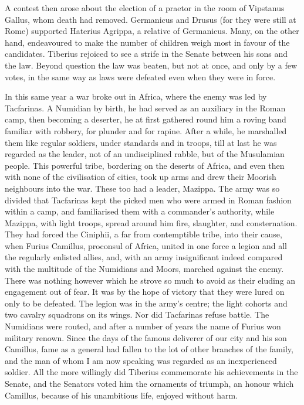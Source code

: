 
A contest then arose about the election of a praetor in the room of Vipstanus Gallus, whom death had removed. Germanicus and Drusus (for they were still at Rome) supported Haterius Agrippa, a relative of Germanicus. Many, on the other hand, endeavoured to make the number of children weigh most in favour of the candidates. Tiberius rejoiced to see a strife in the Senate between his sons and the law. Beyond question the law was beaten, but not at once, and only by a few votes, in the same way as laws were defeated even when they were in force.


In this same year a war broke out in Africa, where the enemy was led by Tacfarinas. A Numidian by birth, he had served as an auxiliary in the Roman camp, then becoming a deserter, he at first gathered round him a roving band familiar with robbery, for plunder and for rapine. After a while, he marshalled them like regular soldiers, under standards and in troops, till at last he was regarded as the leader, not of an undisciplined rabble, but of the Musulamian people. This powerful tribe, bordering on the deserts of Africa, and even then with none of the civilisation of cities, took up arms and drew their Moorish neighbours into the war. These too had a leader, Mazippa. The army was so divided that Tacfarinas kept the picked men who were armed in Roman fashion within a camp, and familiarised them with a commander's authority, while Mazippa, with light troops, spread around him fire, slaughter, and consternation. They had forced the Ciniphii, a far from contemptible tribe, into their cause, when Furius Camillus, proconsul of Africa, united in one force a legion and all the regularly enlisted allies, and, with an army insignificant indeed compared with the multitude of the Numidians and Moors, marched against the enemy. There was nothing however which he strove so much to avoid as their eluding an engagement out of fear. It was by the hope of victory that they were lured on only to be defeated. The legion was in the army's centre; the light cohorts and two cavalry squadrons on its wings. Nor did Tacfarinas refuse battle. The Numidians were routed, and after a number of years the name of Furius won military renown. Since the days of the famous deliverer of our city and his son Camillus, fame as a general had fallen to the lot of other branches of the family, and the man of whom I am now speaking was regarded as an inexperienced soldier. All the more willingly did Tiberius commemorate his achievements in the Senate, and the Senators voted him the ornaments of triumph, an honour which Camillus, because of his unambitious life, enjoyed without harm.

